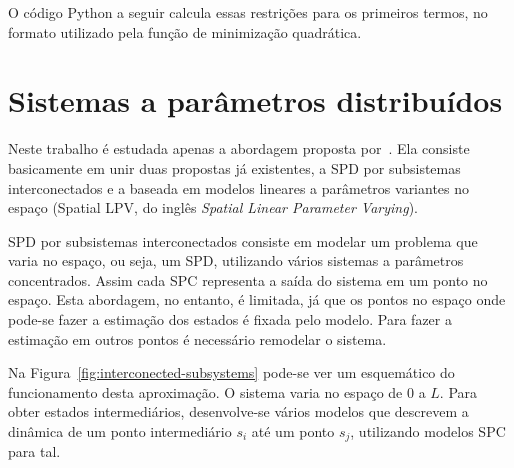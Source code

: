 O código Python a seguir calcula essas restrições para os primeiros termos, no
formato utilizado pela função de minimização quadrática.

\vfill{}

\section{Sistemas a parâmetros distribuídos}%
\label{sec:spd}

Neste trabalho é estudada apenas a abordagem proposta
por~\textcite{masterthesis:nelson}. Ela consiste basicamente em unir duas
propostas já existentes, a SPD por subsistemas interconectados e a baseada em
modelos lineares a parâmetros variantes no espaço (Spatial \ac{LPV}, do inglês
\textit{Spatial Linear Parameter Varying}).

SPD por subsistemas interconectados consiste em modelar um problema que varia no
espaço, ou seja, um \ac{SPD}, utilizando vários sistemas a parâmetros
concentrados. Assim cada \ac{SPC} representa a saída do sistema em um ponto no
espaço. Esta abordagem, no entanto, é limitada, já que os pontos no espaço onde
pode-se fazer a estimação dos estados é fixada pelo modelo. Para fazer a
estimação em outros pontos é necessário remodelar o sistema.

Na Figura~\ref{fig:interconected-subsystems} pode-se ver um esquemático do
funcionamento desta aproximação. O sistema varia no espaço de \( 0 \) a \( L \).
Para obter estados intermediários, desenvolve-se vários modelos que descrevem a
dinâmica de um ponto intermediário \( s_i \) até um ponto \( s_j \), utilizando
modelos \ac{SPC} para tal.

